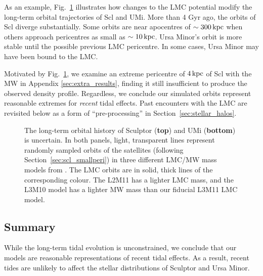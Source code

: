 As an example, Fig.~\ref{fig:scl_orbit_lmc_uncert} illustrates how
changes to the LMC potential modify the long-term orbital trajectories
of Scl and UMi. More than 4 Gyr ago, the orbits of Scl diverge
substantially. Some orbits are near apocentres of \(\sim 300\,{\rm kpc}\)
when others approach pericentres as small as \(\sim 10\,{\rm kpc}\). Ursa
Minor's orbit is more stable until the possible previous LMC pericentre.
In some cases, Ursa Minor may have been bound to the LMC.

Motivated by Fig.~\ref{fig:scl_orbit_lmc_uncert}, we examine an extreme
pericentre of \(4\,{\rm kpc}\) of Scl with the MW in Appendix
\ref{sec:extra_results}, finding it still insufficient to produce the
observed density profile. Regardless, we conclude our simulated orbits
represent reasonable extremes for \emph{recent} tidal effects. Past
encounters with the LMC are revisited below as a form of
``pre-processing'' in Section~\ref{sec:stellar_halos}.

\begin{figure}
\centering
{}
\caption[Long term orbital uncertainties]{The long-term orbital history
of Sculptor (\textbf{top}) and UMi (\textbf{bottom}) is uncertain. In
both panels, light, transparent lines represent randomly sampled orbits
of the satellites (following Section~\ref{sec:scl_smallperi}) in three
different LMC/MW mass models from \citet{vasiliev2024}. The LMC orbits
are in solid, thick lines of the corresponding colour. The L2M11 has a
lighter LMC mass, and the L3M10 model has a lighter MW mass than our
fiducial L3M11 LMC model.}\label{fig:scl_orbit_lmc_uncert}
\end{figure}

\subsection{Summary}\label{summary-2}

While the long-term tidal evolution is unconstrained, we conclude that
our models are reasonable representations of recent tidal effects. As a
result, recent tides are unlikely to affect the stellar distributions of
Sculptor and Ursa Minor.
